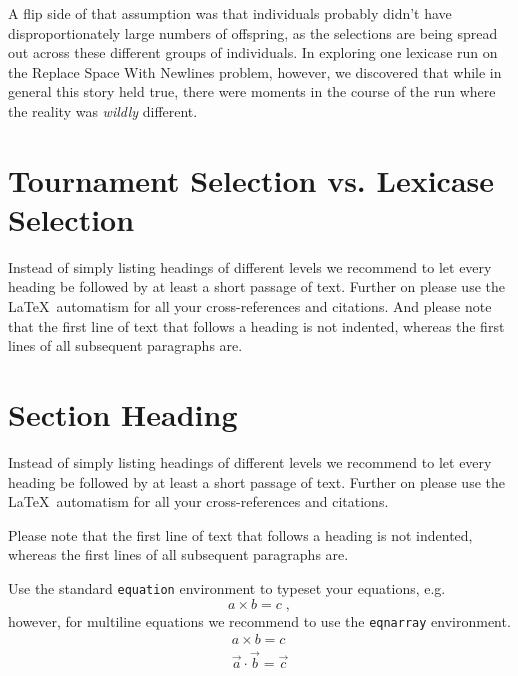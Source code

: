 A flip side of that assumption was that individuals probably didn't have disproportionately 
large numbers of offspring, as the selections are being spread out across these different groups
of individuals. In exploring one lexicase run on the Replace Space With Newlines problem, however,
we discovered that while in general this story held true, there were moments in the course of the run
where the reality was \emph{wildly} different.

\section{Tournament Selection vs. Lexicase Selection}
\label{sec:1}


Instead of simply listing headings of different levels we recommend to
let every heading be followed by at least a short passage of text.
Further on please use the \LaTeX\ automatism for all your
cross-references and citations. And please note that the first line of
text that follows a heading is not indented, whereas the first lines of
all subsequent paragraphs are.

\section{Section Heading}
\label{sec:2}
Instead of simply listing headings of different levels we recommend to
let every heading be followed by at least a short passage of text.
Further on please use the \LaTeX\ automatism for all your
cross-references and citations.

Please note that the first line of text that follows a heading is not indented, whereas the first 
lines of all subsequent paragraphs are.

Use the standard \verb|equation| environment to typeset your equations, e.g.
%
\begin{equation}
a \times b = c\;,
\end{equation}
%
however, for multiline equations we recommend to use the \verb|eqnarray| environment.
\begin{eqnarray}
a \times b = c \nonumber\\
\vec{a} \cdot \vec{b}=\vec{c}
\label{eq:01}
\end{eqnarray}


